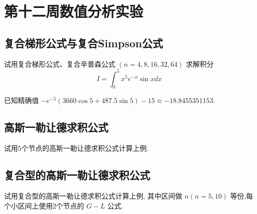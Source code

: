 \section{第十二周数值分析实验}
\subsection{复合梯形公式与复合Simpson公式}
\begin{ex}
	试用复合梯形公式、复合辛普森公式 $(n=4,8,16,32,64)$ 求解积分
	$$
	I=\int_0^5 x^5 e^{-x} \sin x d x
	$$
	
	已知精确值 $-e^{-5}(3660 \cos 5+487.5 \sin 5)-15 \approx-18.8455351153$.
\end{ex}

\subsection{高斯一勒让德求积公式}
\begin{ex}
	试用$5$个节点的高斯一勒让德求积公式计算上例.
\end{ex}

\subsection{复合型的高斯一勒让德求积公式}
\begin{ex}
	试用复合型的高斯一勒让德求积公式计算上例, 其中区间做 $n(n=5,10)$ 等份,每个小区间上使用$2$个节点的 $G-L$ 公式.
\end{ex}
